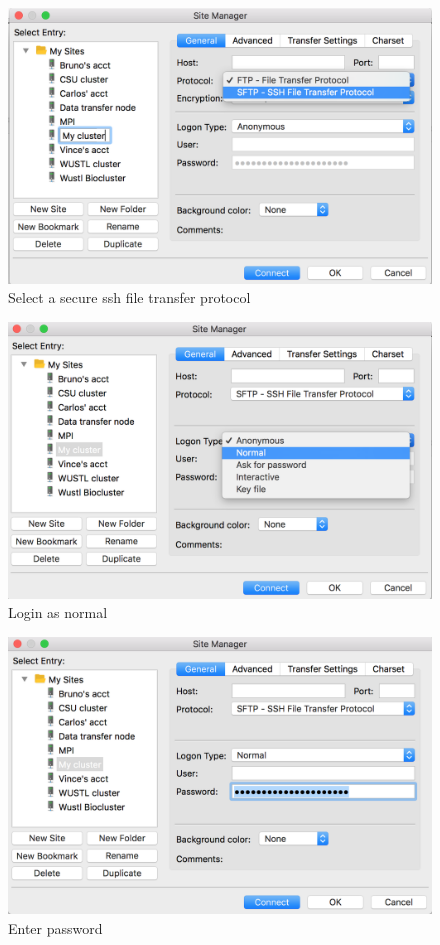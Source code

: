 \documentclass[]{book}
\theoremstyle{definition}
\theoremstyle{definition}
\theoremstyle{definition}
\theoremstyle{remark}
\begin{document}
\begin{figure}
\centering
\includegraphics{SFTP.png}
\caption{Select a secure ssh file transfer protocol}
\end{figure}

\begin{figure}
\centering
\includegraphics{Choose normal.png}
\caption{Login as normal}
\end{figure}

\begin{figure}
\centering
\includegraphics{Enter password.png}
\caption{Enter password}
\end{figure}
\end{document}
